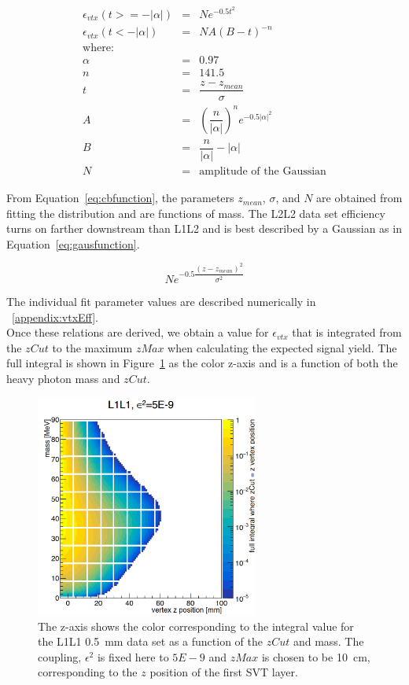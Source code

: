 \begin{eqnarray*}
\label{eq:cbfunction}
\epsilon_{vtx}(t >= -| \alpha |) & = & N e^{-0.5t^{2}}\\
\epsilon_{vtx}(t < -| \alpha |) & = & N A(B-t)^{-n}\\
\textrm{where:}\\
\alpha & = & 0.97\\
n & = & 141.5\\
t & = & \dfrac{z-z_{mean}}{\sigma}\\
A & = & (\dfrac{n}{| \alpha |})^{n}e^{-0.5 |\alpha |^2}\\
B & = & \dfrac{n}{| \alpha |}-|\alpha | \\
N & = & \textrm{amplitude of the Gaussian}
\end{eqnarray*}

From Equation~\eqref{eq:cbfunction}, the parameters $z_{mean}$, $\sigma$, and $N$ are obtained from fitting the distribution and are functions of mass. The L2L2 data set efficiency turns on farther downstream than L1L2 and is best described by a Gaussian as in Equation~\eqref{eq:gausfunction}.

\begin{equation}
\label{eq:gausfunction}
Ne^{-0.5\dfrac{(z-z_{mean})^2}{\sigma^2}}
\end{equation}

The individual fit parameter values are described numerically in ~\ref{appendix:vtxEff}.\\
\indent Once these relations are derived, we obtain a value for $\epsilon_{vtx}$ that is integrated from the $zCut$ to the maximum $zMax$ when calculating the expected signal yield. The full integral is shown in Figure~\ref{fig:effIntegral} as the color z-axis and is a function of both the heavy photon mass and $zCut$.  

\begin{figure}[htb]
  \centering
      \includegraphics[width=0.65\textwidth]{pics/searching/integralEffL1L1.png}
  \caption[Integral as a function of mass and $zCut$ for L1L1]{The z-axis shows the color corresponding to the integral value for the L1L1 0.5~mm data set as a function of the $zCut$ and mass. The coupling, $\epsilon^2$ is fixed here to $5E-9$ and $zMax$ is chosen to be 10~cm, corresponding to the $z$ position of the first SVT layer. }
  \label{fig:effIntegral}
\end{figure}

